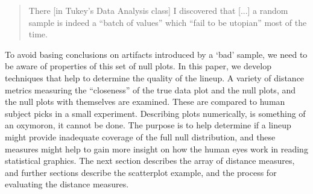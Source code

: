 \documentclass[12]{article}
\begin{document}
\begin{quotation}
There [in Tukey's Data Analysis class] I discovered that [...]  a random sample is indeed a ``batch of values'' which ``fail to be utopian'' most of the time.
\end{quotation}

To avoid basing conclusions on artifacts introduced by a `bad' sample, we need to be aware of properties of this set of null plots. In this paper, we develop techniques that help to determine the quality of the lineup. A variety of distance metrics measuring the ``closeness'' of the true data plot and the null plots, and the null plots with themselves are examined. These are compared to human subject picks in a small experiment.  Describing plots numerically, is something  of an oxymoron, it cannot be done. The purpose is to help determine if a lineup might provide inadequate coverage of the full null distribution, and these measures might help to gain more insight on how the human eyes work in reading statistical graphics. The next section describes the array of distance measures, and further sections describe the scatterplot example, and the process for evaluating the distance measures. 



\end{document}

